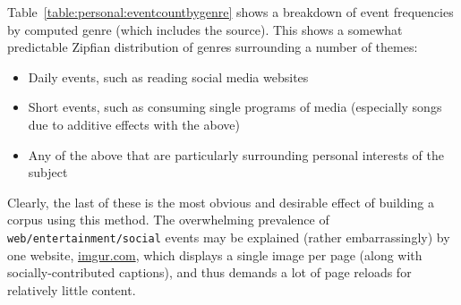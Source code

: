 Table~\ref{table:personal:eventcountbygenre} shows a breakdown of event frequencies by computed genre (which includes the source).  This shows a somewhat predictable Zipfian distribution of genres surrounding a number of themes:

\begin{itemize}
    \item Daily events, such as reading social media websites
    \item Short events, such as consuming single programs of media (especially songs due to additive effects with the above)
    \item Any of the above that are particularly surrounding personal interests of the subject
\end{itemize}

Clearly, the last of these is the most obvious and desirable effect of building a corpus using this method.  The overwhelming prevalence of \texttt{web/entertainment/social} events may be explained (rather embarrassingly) by one website, \url{imgur.com}, which displays a single image per page (along with socially-contributed captions), and thus demands a lot of page reloads for relatively little content.


